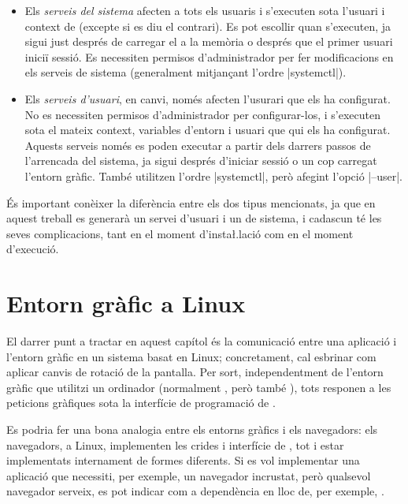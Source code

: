 \begin{itemize}
    \item Els \emph{serveis del sistema} afecten a tots els usuaris i
    s'executen sota l'usuari i context de  (excepte si es diu
    el contrari). Es pot escollir quan s'executen, ja sigui just després de
    carregar el  a la memòria o després que el primer usuari
    iniciï sessió. Es necessiten permisos d'administrador per fer modificacions
    en els serveis de sistema (generalment mitjançant l'ordre \ord|systemctl|).
    \item Els \emph{serveis d'usuari}, en canvi, només afecten l'usurari
    que els ha configurat. No es necessiten permisos d'administrador per
    configurar-los, i s'executen sota el mateix context, variables d'entorn i
    usuari que qui els ha configurat. Aquests serveis només es poden executar a
    partir dels darrers passos de l'arrencada del sistema, ja sigui després
    d'iniciar sessió o un cop carregat l'entorn gràfic. També utilitzen l'ordre
    \ord|systemctl|, però afegint l'opció \ord|--user|.
\end{itemize}

És important conèixer la diferència entre els dos tipus mencionats, ja que en
aquest treball es generarà un servei d'usuari i un de sistema, i cadascun té
les seves complicacions, tant en el moment d'insta\l.lació com en el moment
d'execució.

\section{Entorn gràfic a Linux}

El darrer punt a tractar en aquest capítol és la comunicació entre una
aplicació i l'entorn gràfic en un sistema basat en Linux; concretament, cal
esbrinar com aplicar canvis de rotació de la pantalla. Per sort, 
independentment de l'entorn gràfic que utilitzi un ordinador (normalment
, però també ), tots responen a les peticions gràfiques
sota la interfície de programació de  \cite{Xlib}.

Es podria fer una bona analogia entre
els entorns gràfics i els navegadors: els navegadors, a Linux, implementen les
crides i interfície de , tot i estar implementats internament
de formes diferents. Si es vol implementar una aplicació que necessiti, per
exemple, un navegador incrustat, però qualsevol navegador serveix, es pot
indicar com a dependència  en lloc de, per exemple, .

